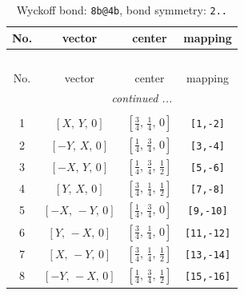 \documentclass[fleqn,8pt]{jsarticle}
\begin{document}
\begin{longtable}{cccc}
\caption{Wyckoff bond: {\tt 8b@4b}, bond symmetry: {\tt 2..}}
 \\
 \hline \hline
No. & vector & center & mapping \\ \hline \endfirsthead

\multicolumn{3}{l}{\tablename\ \thetable{}} \\
 \hline \hline
No. & vector & center & mapping \\ \hline \endhead

 \hline \hline
\multicolumn{3}{r}{\footnotesize\it continued ...} \\ \endfoot

 \hline \hline
\multicolumn{3}{r}{} \\ \endlastfoot

1 & $\left[ X,\, Y,\, 0 \right]$ & $\left[ \frac{3}{4},\, \frac{1}{4},\, 0 \right]$ & {\tt [1,-2]} \\ \hline
2 & $\left[ - Y,\, X,\, 0 \right]$ & $\left[ \frac{1}{4},\, \frac{3}{4},\, 0 \right]$ & {\tt [3,-4]} \\ \hline
3 & $\left[ - X,\, Y,\, 0 \right]$ & $\left[ \frac{1}{4},\, \frac{3}{4},\, \frac{1}{2} \right]$ & {\tt [5,-6]} \\ \hline
4 & $\left[ Y,\, X,\, 0 \right]$ & $\left[ \frac{3}{4},\, \frac{1}{4},\, \frac{1}{2} \right]$ & {\tt [7,-8]} \\ \hline
5 & $\left[ - X,\, - Y,\, 0 \right]$ & $\left[ \frac{1}{4},\, \frac{3}{4},\, 0 \right]$ & {\tt [9,-10]} \\ \hline
6 & $\left[ Y,\, - X,\, 0 \right]$ & $\left[ \frac{3}{4},\, \frac{1}{4},\, 0 \right]$ & {\tt [11,-12]} \\ \hline
7 & $\left[ X,\, - Y,\, 0 \right]$ & $\left[ \frac{3}{4},\, \frac{1}{4},\, \frac{1}{2} \right]$ & {\tt [13,-14]} \\ \hline
8 & $\left[ - Y,\, - X,\, 0 \right]$ & $\left[ \frac{1}{4},\, \frac{3}{4},\, \frac{1}{2} \right]$ & {\tt [15,-16]} \\
\end{longtable}
\renewcommand{\arraystretch}{1.2}
\end{document}
